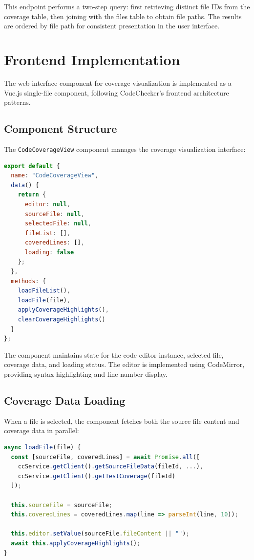 This endpoint performs a two-step query: first retrieving distinct file IDs from the coverage table, then joining with the files table to obtain file paths. The results are ordered by file path for consistent presentation in the user interface.

\section{Frontend Implementation}

The web interface component for coverage visualization is implemented as a Vue.js single-file component, following CodeChecker's frontend architecture patterns.

\subsection{Component Structure}

The \texttt{CodeCoverageView} component manages the coverage visualization interface:

\begin{lstlisting}[language=JavaScript, caption={CodeCoverageView component structure}]
export default {
  name: "CodeCoverageView",
  data() {
    return {
      editor: null,
      sourceFile: null,
      selectedFile: null,
      fileList: [],
      coveredLines: [],
      loading: false
    };
  },
  methods: {
    loadFileList(),
    loadFile(file),
    applyCoverageHighlights(),
    clearCoverageHighlights()
  }
};
\end{lstlisting}

The component maintains state for the code editor instance, selected file, coverage data, and loading status. The editor is implemented using CodeMirror, providing syntax highlighting and line number display.

\subsection{Coverage Data Loading}

When a file is selected, the component fetches both the source file content and coverage data in parallel:

\begin{lstlisting}[language=JavaScript, caption={Loading file and coverage data}]
async loadFile(file) {
  const [sourceFile, coveredLines] = await Promise.all([
    ccService.getClient().getSourceFileData(fileId, ...),
    ccService.getClient().getTestCoverage(fileId)
  ]);
  
  this.sourceFile = sourceFile;
  this.coveredLines = coveredLines.map(line => parseInt(line, 10));
  
  this.editor.setValue(sourceFile.fileContent || "");
  await this.applyCoverageHighlights();
}
\end{lstlisting}

